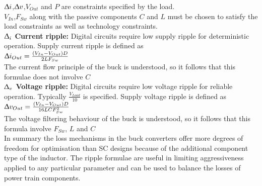 \documentclass[letterpaper,twocolumn,10pt]{article}
\begin{document}
$\Updelta i$,$\Updelta v$,$V_{Out}$ and $P$ are constraints specified by the load.\\
$V_{In}$,$F_{Sw}$ along with the passive components $C$ and $L$ must be chosen to satisfy the load constraints as well as technology constraints.\\
\textbf{$\Updelta_i$ Current ripple: }Digital circuits require low supply ripple for deterministic operation. Supply current ripple is defined as\\
$\Updelta i_{Out} = \frac{(V_{In} - V_{Out})D}{2LF_{Sw}}$ ~\cite{Kurson2006}\\
The current flow principle of the buck is understood, so it follows that this formulae does not involve $C$\\
\textbf{$\Updelta_v$ Voltage ripple: }Digital circuits require low voltage ripple for reliable operation. Typically $\frac{V_{Load}}{10}$ is specified. Supply voltage ripple is defined as\\
$\Updelta v_{Out} = \frac{(V_{In} - V_{Out})D}{16LCF_{Sw}^2}$ ~\cite{Kurson2006}\\
The voltage filtering behaviour of the buck is understood, so it follows that this formula involve $F_{Sw}$, $L$ and $C$\\

\indent In summary the loss mechanisms in the buck converters offer more degrees of freedom for optimisation than SC designs because of the additional component type of the inductor. The ripple formulae are useful in limiting aggressiveness applied to any particular parameter and can be used to balance the losses of power train components.
\end{document}
